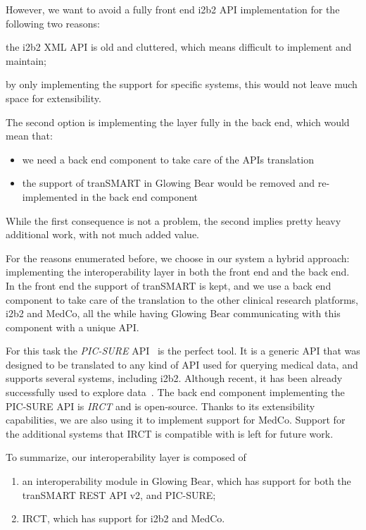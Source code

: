 However, we want to avoid a fully front end i2b2 API implementation for the following two reasons: 
\begin{enumerate*}
    \item the i2b2 XML API is old and cluttered, which means difficult to implement and maintain;
    \item by only implementing the support for specific systems, this would not leave much space for extensibility.
\end{enumerate*}

\begin{samepage}
The second option is implementing the layer fully in the back end, which would mean that:
\begin{itemize}
    \item we need a back end component to take care of the APIs translation
    \item the support of tranSMART in Glowing Bear would be removed and re-implemented in the back end component
\end{itemize}
While the first consequence is not a problem, the second implies pretty heavy additional work, with not much added value.
\end{samepage}


For the reasons enumerated before, we choose in our system a hybrid approach: implementing the interoperability layer in both the front end and the back end.
In the front end the support of tranSMART is kept, and we use a back end component to take care of the translation to the other clinical research platforms, i2b2 and MedCo, all the while having Glowing Bear communicating with this component with a unique API.

For this task the \emph{PIC-SURE} API~\cite{PIC-SURE-API} is the perfect tool.
It is a generic API that was designed to be translated to any kind of API used for querying medical data, and supports several systems, including i2b2.
Although recent, it has been already successfully used to explore data~\cite{patel2016database}.
The back end component implementing the PIC-SURE API is \emph{IRCT} and is open-source.
Thanks to its extensibility capabilities, we are also using it to implement support for MedCo.
Support for the additional systems that IRCT is compatible with is left for future work.

To summarize, our interoperability layer is composed of 
\begin{enumerate}
    \item an interoperability module in  Glowing Bear, which has support for both the tranSMART REST API v2, and PIC-SURE;
    \item IRCT, which has support for i2b2 and MedCo.
\end{enumerate} 


